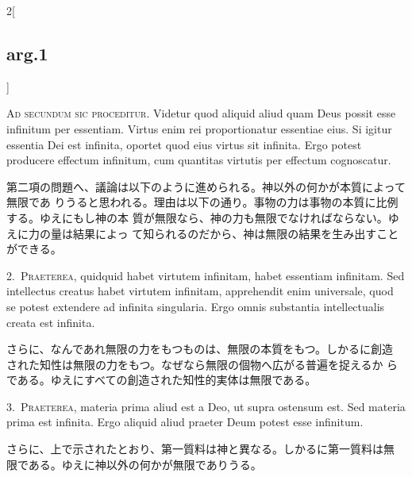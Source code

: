 \documentclass[paper=a4paper,fontsize=10pt,jafontsize=9pt,titlepage]{jlreq}
\begin{document}
\begin{paracol}{2}[\subsection{arg.1}]

{\huge A}{\scshape d secundum sic proceditur}. Videtur quod aliquid
aliud quam Deus possit esse infinitum per essentiam. Virtus enim rei
proportionatur essentiae eius. Si igitur essentia Dei est infinita,
oportet quod eius virtus sit infinita. Ergo potest producere effectum
infinitum, cum quantitas virtutis per effectum cognoscatur.

\switchcolumn

第二項の問題へ、議論は以下のように進められる。神以外の何かが本質によって無限であ
 りうると思われる。理由は以下の通り。事物の力は事物の本質に比例する。ゆえにもし神の本
 質が無限なら、神の力も無限でなければならない。ゆえに力の量は結果によっ
 て知られるのだから、神は無限の結果を生み出すことができる。


2.~{\scshape Praeterea}, quidquid habet virtutem infinitam, habet essentiam
infinitam. Sed intellectus creatus habet virtutem infinitam, apprehendit
enim universale, quod se potest extendere ad infinita singularia. Ergo
omnis substantia intellectualis creata est infinita.

\switchcolumn

さらに、なんであれ無限の力をもつものは、無限の本質をもつ。しかるに創造
 された知性は無限の力をもつ。なぜなら無限の個物へ広がる普遍を捉えるか
 らである。ゆえにすべての創造された知性的実体は無限である。


3.~{\scshape Praeterea}, materia prima aliud est a Deo, ut supra
ostensum est. Sed materia prima est infinita. Ergo aliquid aliud praeter
Deum potest esse infinitum.

\switchcolumn

さらに、上で示されたとおり、第一質料は神と異なる。しかるに第一質料は無
 限である。ゆえに神以外の何かが無限でありうる。

\switchcolumn*[\subsection{s.c.}]


\end{paracol}
\end{document}
